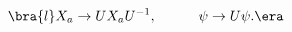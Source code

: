 \begin{equation}
\bra{l}
X_a \rightarrow U X_a U^{-1},~~~~~~~~~
\psi \rightarrow U \psi.
\label{transf}
\era
\end{equation}

